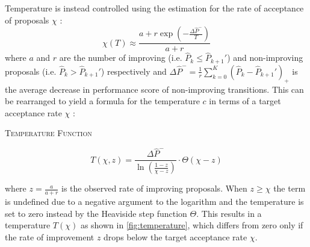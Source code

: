 \documentclass[oneside, a4paper]{book}
\newcommand{\equationnamed}[2]{%
  \setlength{\fboxsep}{2pt} %
  \setlength{\fboxrule}{0.01pt}
  \begin{center}
    \begin{minipage}{\textwidth}
      \begin{center}\textsc{#1}\end{center}
      #2
    \end{minipage}
  \end{center}
}
\newcommand\br[1]{\left(#1\right)}
\begin{document}
    Temperature is instead controlled using the estimation for the rate of acceptance of proposals $\chi$ \autocite{simulated-annealing}:
    \begin{equation}
      \chi\br{T} \approx \frac{a+r \exp\br{-\frac{\Delta\hat{P}^-}{T}}}{a+r}
    \end{equation}
    where $a$ and $r$ are the number of improving (i.e. $\hat{P}_k\leq\hat{P}_{k+1}'$) and non-improving proposals (i.e. $\hat{P}_k>\hat{P}_{k+1}'$) respectively and $\Delta \hat{P}^- = \frac{1}{r}\sum_{k=0}^K \br{\hat{P}_k - \hat{P}_{k+1}'}_+$ is the average decrease in performance score of non-improving transitions. This can be rearranged to yield a formula for the temperature $c$ in terms of a target acceptance rate $\chi$ \autocite{simulated-annealing}:
    \equationnamed{Temperature Function}{
      \begin{equation}\label{eq:c-from-chi}
        T\br{\chi,z} 
        = \frac{\Delta \hat{P}^-}{\ln\br{\frac{1-z}{\chi-z}}} \cdot \Theta\br{\chi-z}
      \end{equation}
    }
    
    where $z=\frac{a}{a+r}$ is the observed rate of improving proposals. When $z\geq\chi$ the term is undefined due to a negative argument to the logarithm and the temperature is set to zero instead by the Heaviside step function $\Theta$. This results in a temperature $T\br{\chi}$ as shown in \autoref{fig:temperature}, which differs from zero only if the rate of improvement $z$ drops below the target acceptance rate $\chi$.
\end{document}
